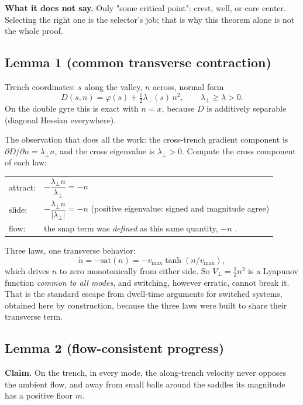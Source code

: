 \documentclass[11pt]{article}
\begin{document}
\textbf{What it does not say.} Only "some critical point": crest, well, or
core center. Selecting the right one is the selector's job; that is why
this theorem alone is not the whole proof.

\subsection{Lemma 1 (common transverse contraction)}

Trench coordinates: $s$ along the valley, $n$ across, normal form
\begin{equation}
D(s, n) = \varphi(s) + \tfrac{1}{2}\lambda_\perp(s)\,n^2,
\qquad \lambda_\perp \geq \underline{\lambda} > 0 .
\end{equation}
On the double gyre this is exact with $n = x$, because $D$ is additively
separable (diagonal Hessian everywhere).

The observation that does all the work: the cross-trench gradient
component is $\partial D/\partial n = \lambda_\perp n$, and the cross
eigenvalue is $\lambda_\perp > 0$. Compute the cross component of each law:
\begin{center}
\begin{tabular}{ll}
attract: & $-\dfrac{\lambda_\perp n}{\lambda_\perp} = -n$ \\[6pt]
slide: & $-\dfrac{\lambda_\perp n}{|\lambda_\perp|} = -n$
\quad (positive eigenvalue: signed and magnitude agree) \\[6pt]
flow: & the snap term was \emph{defined} as this same quantity, $-n$ .
\end{tabular}
\end{center}
Three laws, one transverse behavior:
\begin{equation}
\dot{n} = -\mathrm{sat}(n) = -v_{\max}\tanh(n/v_{\max}),
\end{equation}
which drives $n$ to zero monotonically from either side. So
$V_\perp = \tfrac{1}{2}n^2$ is a Lyapunov function \emph{common to all
modes}, and switching, however erratic, cannot break it. That is the
standard escape from dwell-time arguments for switched systems, obtained
here by construction, because the three laws were built to share their
transverse term.

\subsection{Lemma 2 (flow-consistent progress)}

\textbf{Claim.} On the trench, in every mode, the along-trench velocity
never opposes the ambient flow, and away from small balls around the
saddles its magnitude has a positive floor $m$.
\end{document}
